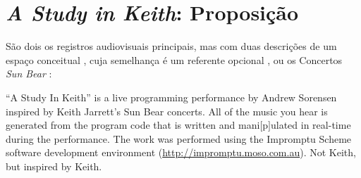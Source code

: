 
\section{\emph{A Study in Keith}: Proposição}

São dois os registros audiovisuais principais, mas com duas descrições de um espaço conceitual , cuja semelhança é um referente opcional , ou os Concertos \emph{Sun Bear} :

\begin{citacao}
{
``A Study In Keith'' is a live programming performance by Andrew Sorensen inspired by Keith Jarrett's Sun Bear concerts. All of the music you hear is generated from the program code that is written and mani$[$p$]$ulated in real-time during the performance. The work was performed using the Impromptu Scheme software development environment (\url{http://impromptu.moso.com.au}). Not Keith, but inspired by Keith.
}
\end{citacao}

